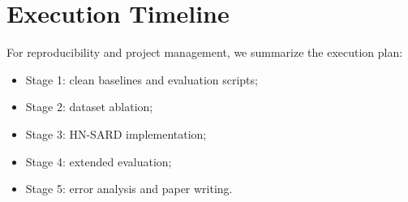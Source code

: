 \documentclass[conference,a4paper]{IEEEtran}
\begin{document}
\section{Execution Timeline}
\label{app:timeline}

For reproducibility and project management, we summarize the execution plan:
\begin{itemize}
    \item Stage 1: clean baselines and evaluation scripts;
    \item Stage 2: dataset ablation;
    \item Stage 3: HN-SARD implementation;
    \item Stage 4: extended evaluation;
    \item Stage 5: error analysis and paper writing.
\end{itemize}
\end{document}
